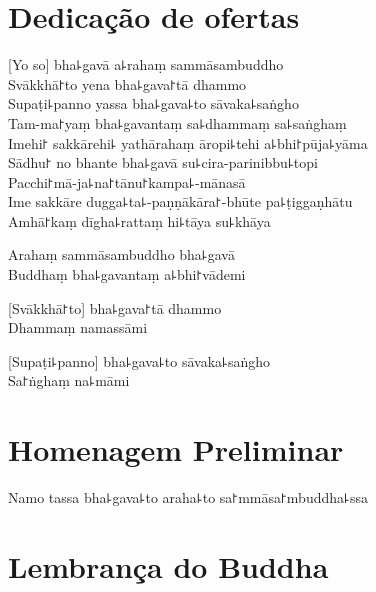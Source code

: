 
\chapter{Dedicação de ofertas}   %

[Yo so] bha꜕gavā a꜕rahaṃ sammāsambuddho\\
Svākkhā꜓to yena bha꜕gava꜓tā dhammo\\
Supaṭi꜕panno yassa bha꜕gava꜕to sāvaka꜕saṅgho\\
Tam-ma꜓yaṃ bha꜕gavantaṃ sa꜕dhammaṃ sa꜕saṅghaṃ\\
Imehi꜓ sakkārehi꜕ yathārahaṃ āropi꜕tehi a꜕bhi꜓pūja꜕yāma\\
Sādhu꜓ no bhante bha꜕gavā su꜕cira-parinibbu꜕topi\\
Pacchi꜓mā-ja꜕na꜓tānu꜓kampa꜕-mānasā\\
Ime sakkāre dugga꜕ta꜕-paṇṇākāra꜓-bhūte pa꜕ṭiggaṇhātu\\
Amhā꜓kaṃ dīgha꜕rattaṃ hi꜕tāya su꜕khāya

Arahaṃ sammāsambuddho bha꜕gavā\\
Buddhaṃ bha꜕gavantaṃ a꜕bhi꜓vādemi 

[Svākkhā꜓to] bha꜕gava꜓tā dhammo\\
Dhammaṃ namassāmi 

[Supaṭi꜕panno] bha꜕gava꜕to sāvaka꜕saṅgho\\
Sa꜓ṅghaṃ na꜕māmi 

\chapter{Homenagem Preliminar}

\begin{leader}
\end{leader}

Namo tassa bha꜕gava꜕to araha꜕to sa꜓mmāsa꜓mbuddha꜕ssa


\clearpage

\chapter{Lembrança do Buddha}     %

\begin{leader}
\end{leader}

